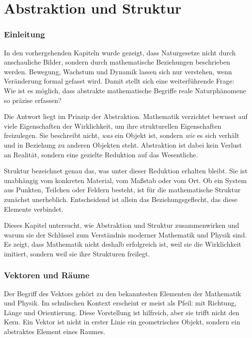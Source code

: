 \chapter{Abstraktion und Struktur}
\label{chap:VI_abstraktion}



\subsection{Einleitung}

In den vorhergehenden Kapiteln wurde gezeigt, dass Naturgesetze nicht durch anschauliche Bilder, sondern durch mathematische Beziehungen beschrieben werden. Bewegung, Wachstum und Dynamik lassen sich nur verstehen, wenn Veränderung formal gefasst wird. Damit stellt sich eine weiterführende Frage: Wie ist es möglich, dass abstrakte mathematische Begriffe reale Naturphänomene so präzise erfassen?

Die Antwort liegt im Prinzip der Abstraktion. Mathematik verzichtet bewusst auf viele Eigenschaften der Wirklichkeit, um ihre strukturellen Eigenschaften freizulegen. Sie beschreibt nicht, \emph{was} ein Objekt ist, sondern \emph{wie} es sich verhält und in Beziehung zu anderen Objekten steht. Abstraktion ist dabei kein Verlust an Realität, sondern eine gezielte Reduktion auf das Wesentliche.

Struktur bezeichnet genau das, was unter dieser Reduktion erhalten bleibt. Sie ist unabhängig vom konkreten Material, vom Maßstab oder vom Ort. Ob ein System aus Punkten, Teilchen oder Feldern besteht, ist für die mathematische Struktur zunächst unerheblich. Entscheidend ist allein das Beziehungsgeflecht, das diese Elemente verbindet.

Dieses Kapitel untersucht, wie Abstraktion und Struktur zusammenwirken und warum sie der Schlüssel zum Verständnis moderner Mathematik und Physik sind. Es zeigt, dass Mathematik nicht deshalb erfolgreich ist, weil sie die Wirklichkeit imitiert, sondern weil sie ihre Strukturen freilegt.

\subsection{Vektoren und Räume}

Der Begriff des Vektors gehört zu den bekanntesten Elementen der Mathematik und Physik. Im schulischen Kontext erscheint er meist als Pfeil: mit Richtung, Länge und Orientierung. Diese Vorstellung ist hilfreich, aber sie trifft nicht den Kern. Ein Vektor ist nicht in erster Linie ein geometrisches Objekt, sondern ein abstraktes Element eines Raumes.

